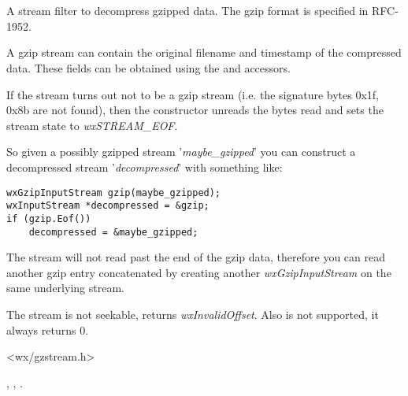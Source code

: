 %
%

%
%

\section{}\label{wxgzipinputstream}

A stream filter to decompress gzipped data. The gzip format is specified in
RFC-1952.

A gzip stream can contain the original filename and timestamp of the
compressed data. These fields can be obtained using the
  and
  accessors.

If the stream turns out not to be a gzip stream (i.e. the signature bytes
0x1f, 0x8b are not found), then the constructor unreads the bytes read and
sets the stream state to {\it wxSTREAM\_EOF}.

So given a possibly gzipped stream '{\it maybe\_gzipped}' you can construct
a decompressed stream '{\it decompressed}' with something like:

\begin{verbatim}
wxGzipInputStream gzip(maybe_gzipped);
wxInputStream *decompressed = &gzip;
if (gzip.Eof())
    decompressed = &maybe_gzipped;

\end{verbatim}
The stream will not read past the end of the gzip data, therefore you
can read another gzip entry concatenated by creating another
 {\it wxGzipInputStream} on the same underlying stream.

The stream is not seekable,  returns
 {\it wxInvalidOffset}.  Also  is
not supported, it always returns $0$.




<wx/gzstream.h>


, 
 ,
 .



